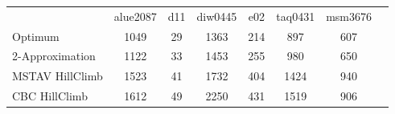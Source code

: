 \begin{tabular}[ht]{|l||c|c|c|c|c|c|H}
 & alue2087 & d11 & diw0445 & e02 & taq0431 & msm3676 & \\  
Optimum &1049 & 29 & 1363 & 214 & 897 & 607 & \\ 
2-Approximation &1122 & 33 & 1453 & 255 & 980 & 650 & \\ 
MSTAV HillClimb &1523 & 41 & 1732 & 404 & 1424 & 940 & \\ 
CBC HillClimb &1612 & 49 & 2250 & 431 & 1519 & 906 & \\ 
\end{tabular}